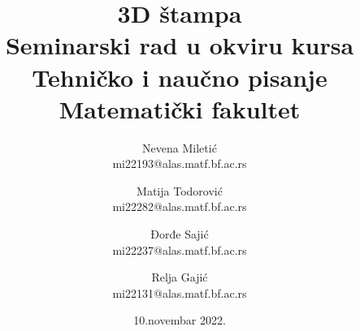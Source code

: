 \documentclass[a4paper]{article}
\begin{document}
\title{3D štampa\\ \small{Seminarski rad u okviru kursa\\Tehničko i naučno pisanje\\ Matematički fakultet}}


\author{    Nevena Miletić\\ mi22193@alas.matf.bf.ac.rs
        \and Matija Todorović\\ mi22282@alas.matf.bf.ac.rs
        \and Đorđe Sajić\\ mi22237@alas.matf.bf.ac.rs
        \and Relja Gajić\\ mi22131@alas.matf.bf.ac.rs
 }

\date{10.novembar 2022.}
\maketitle
\end{document}
